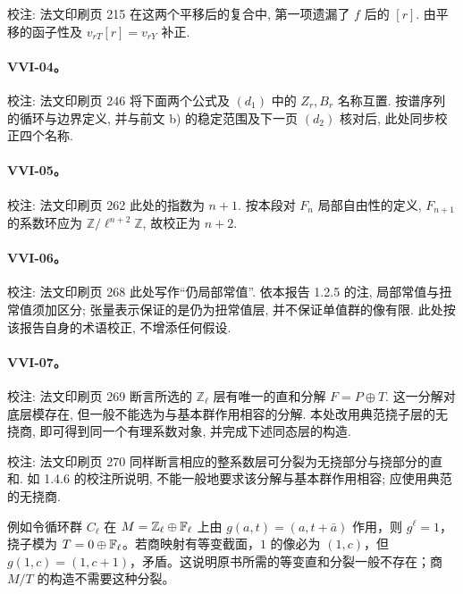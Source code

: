 校注: 法文印刷页 215 在这两个平移后的复合中, 第一项遗漏了 $f$ 后的 $[r]$. 由平移的函子性及 $v_{rT}[r]=v_{rY}$ 补正.

\hypertarget{collation-VVI-04}{}

\paragraph*{VVI-04。}

校注: 法文印刷页 246 将下面两个公式及 $(d_1)$ 中的 $Z_r,B_r$ 名称互置. 按谱序列的循环与边界定义, 并与前文 b) 的稳定范围及下一页 $(d_2)$ 核对后, 此处同步校正四个名称.

\hypertarget{collation-VVI-05}{}

\paragraph*{VVI-05。}

校注: 法文印刷页 262 此处的指数为 $n+1$. 按本段对 $F_n$ 局部自由性的定义, $F_{n+1}$ 的系数环应为 $\mathbb Z/\ell^{n+2}\mathbb Z$, 故校正为 $n+2$.

\hypertarget{collation-VVI-06}{}

\paragraph*{VVI-06。}

校注: 法文印刷页 268 此处写作“仍局部常值”. 依本报告 1.2.5 的注, 局部常值与扭常值须加区分; 张量表示保证的是仍为扭常值层, 并不保证单值群的像有限. 此处按该报告自身的术语校正, 不增添任何假设.

\hypertarget{collation-VVI-07}{}

\paragraph*{VVI-07。}

校注: 法文印刷页 269 断言所选的 \(\mathbb Z_\ell\) 层有唯一的直和分解 \(F=P\oplus T\). 这一分解对底层模存在, 但一般不能选为与基本群作用相容的分解. 本处改用典范挠子层的无挠商, 即可得到同一个有理系数对象, 并完成下述同态层的构造.

校注: 法文印刷页 270 同样断言相应的整系数层可分裂为无挠部分与挠部分的直和. 如 1.4.6 的校注所说明, 不能一般地要求该分解与基本群作用相容; 应使用典范的无挠商.

例如令循环群 $C_\ell$ 在 $M=\mathbb Z_\ell\oplus\mathbb{F}_\ell$ 上由 $g(a,t)=(a,t+\bar a)$ 作用，则 $g^\ell=1$，挠子模为 $T=0\oplus\mathbb{F}_\ell$。若商映射有等变截面，$1$ 的像必为 $(1,c)$，但 $g(1,c)=(1,c+1)$，矛盾。这说明原书所需的等变直和分裂一般不存在；商 $M/T$ 的构造不需要这种分裂。

